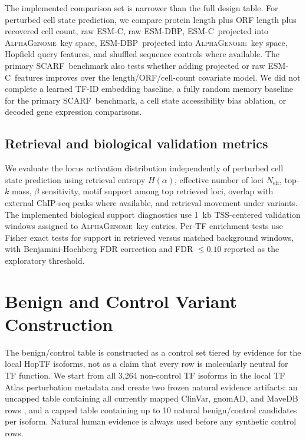 \documentclass{article}
\newcommand{\ag}{\textsc{AlphaGenome}}
\newcommand{\scarf}{\textsc{SCARF}}
\newcommand{\esm}{\textsc{ESM-C}}
\newcommand{\esmdbp}{\textsc{ESM-DBP}}
\begin{document}
The implemented comparison set is narrower than the full design table. For perturbed cell state prediction, we compare protein length plus ORF length plus recovered cell count, raw \esm, raw \esmdbp, \esm\ projected into \ag\ key space, \esmdbp\ projected into \ag\ key space, Hopfield query features, and shuffled sequence controls where available. The primary \scarf\ benchmark also tests whether adding projected or raw \esm\ features improves over the length/ORF/cell-count covariate model. We did not complete a learned TF-ID embedding baseline, a fully random memory baseline for the primary \scarf\ benchmark, a cell state accessibility bias ablation, or decoded gene expression comparisons.

\subsection{Retrieval and biological validation metrics}

We evaluate the locus activation distribution independently of perturbed cell state prediction using retrieval entropy \(H(\alpha)\), effective number of loci \(N_{\mathrm{eff}}\), top-\(k\) mass, \(\beta\) sensitivity, motif support among top retrieved loci, overlap with external ChIP-seq peaks where available, and retrieval movement under variants. The implemented biological support diagnostics use 1~kb TSS-centered validation windows assigned to \ag\ key entries. Per-TF enrichment tests use Fisher exact tests for support in retrieved versus matched background windows, with Benjamini-Hochberg FDR correction and FDR \(\leq 0.10\) reported as the exploratory threshold.

\section{Benign and Control Variant Construction}
\label{app:variant_controls}

The benign/control table is constructed as a control set tiered by evidence for the local HopTF isoforms, not as a claim that every row is molecularly neutral for TF function. We start from all 3,264 non-control TF isoforms in the local TF Atlas perturbation metadata and create two frozen natural evidence artifacts: an uncapped table containing all currently mapped ClinVar, gnomAD, and MaveDB rows \citep{landrum2025clinvar,karczewski2020gnomad,esposito2019mavedb}, and a capped table containing up to 10 natural benign/control candidates per isoform. Natural human evidence is always used before any synthetic control rows.
\end{document}
